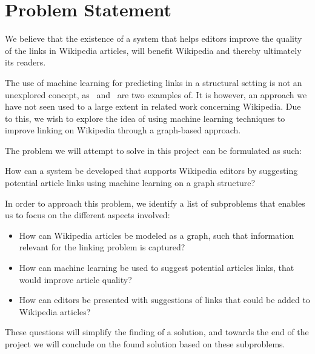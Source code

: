 \section{Problem Statement}\label{sec:problem_statement}
We believe that the existence of a system that helps editors improve the quality of the links in Wikipedia articles, will benefit Wikipedia and thereby ultimately its readers.

The use of machine learning for predicting links in a structural setting is not an unexplored concept, as~\cite{tang2015line} and~\cite{al2006link} are two examples of. It is however, an approach we have not seen used to a large extent in related work concerning Wikipedia. Due to this, we wish to explore the idea of using machine learning techniques to improve linking on Wikipedia through a graph-based approach.

The problem we will attempt to solve in this project can be formulated as such:
\vspace{1ex} %
\begin{formal}
How can a system be developed that supports Wikipedia editors by suggesting potential article links using machine learning on a graph structure?
\end{formal}

In order to approach this problem, we identify a list of subproblems that enables us to focus on the different aspects involved:

\begin{itemize}
  \item How can Wikipedia articles be modeled as a graph, such that information relevant for the linking problem is captured?
  \item How can machine learning be used to suggest potential articles links, that would improve article quality?
  \item How can editors be presented with suggestions of links that could be added to Wikipedia articles?
\end{itemize}

These questions will simplify the finding of a solution, and towards the end of the project we will conclude on the found solution based on these subproblems.

